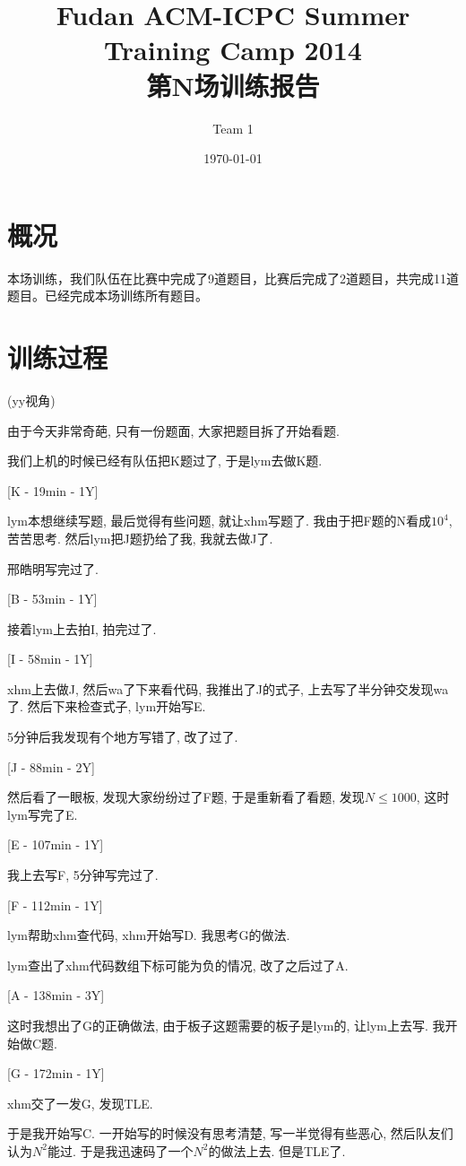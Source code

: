 \documentclass[a4paper, 11pt, nofonts, nocap, fancyhdr]{ctexart}
\title{Fudan ACM-ICPC Summer Training Camp 2014\\第N场训练报告}
\author{Team 1}
\date{\today}
\begin{document}
\maketitle

\section{概况}

本场训练，我们队伍在比赛中完成了9道题目，比赛后完成了2道题目，共完成11道题目。已经完成本场训练所有题目。


\section{训练过程}

(yy视角)

由于今天非常奇葩, 只有一份题面, 大家把题目拆了开始看题.

我们上机的时候已经有队伍把K题过了, 于是lym去做K题.

[K - 19min - 1Y]

lym本想继续写题, 最后觉得有些问题, 就让xhm写题了. 我由于把F题的N看成$10^4$, 苦苦思考. 然后lym把J题扔给了我, 我就去做J了.

邢皓明写完过了.

[B - 53min - 1Y]

接着lym上去拍I, 拍完过了.

[I - 58min - 1Y]

xhm上去做J, 然后wa了下来看代码, 我推出了J的式子, 上去写了半分钟交发现wa了. 然后下来检查式子, lym开始写E.

5分钟后我发现有个地方写错了, 改了过了.

[J - 88min - 2Y]

然后看了一眼板, 发现大家纷纷过了F题, 于是重新看了看题, 发现$N \leq 1000$, 这时lym写完了E.

[E - 107min - 1Y]

我上去写F, 5分钟写完过了.

[F - 112min - 1Y]

lym帮助xhm查代码, xhm开始写D. 我思考G的做法.

lym查出了xhm代码数组下标可能为负的情况, 改了之后过了A.

[A - 138min - 3Y]

这时我想出了G的正确做法, 由于板子这题需要的板子是lym的, 让lym上去写. 我开始做C题.

[G - 172min - 1Y]

xhm交了一发G, 发现TLE.

于是我开始写C. 一开始写的时候没有思考清楚, 写一半觉得有些恶心, 然后队友们认为$N^2$能过. 于是我迅速码了一个$N^2$的做法上去. 但是TLE了.
\end{document}
